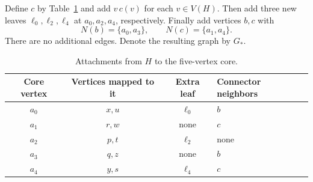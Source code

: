 \documentclass[11pt,a4paper]{article}
\theoremstyle{definition}
\theoremstyle{remark}
\newcommand{\Gstar}{G_{\ast}}
\begin{document}
Define $c$ by Table~\ref{tab:attachments} and add
$v\,c(v)$ for each $v\in V(H)$.
Then add three new leaves $\ell_0,\ell_2,\ell_4$ at
$a_0,a_2,a_4$, respectively. Finally add vertices $b,c$ with
\begin{equation}\label{eq:connectors}
              N(b)=\{a_0,a_3\},\qquad
              N(c)=\{a_1,a_4\}.
\end{equation}
There are no additional edges. Denote the resulting graph by
$\Gstar$.

\begin{table}[htbp]
\centering
\caption{Attachments from $H$ to the five-vertex core.}
\label{tab:attachments}
\begin{tabular}{@{}cccl@{}}
\toprule
Core vertex & Vertices mapped to it & Extra leaf & Connector neighbors\\
\midrule
$a_0$ & $x,u$ & $\ell_0$ & $b$\\
$a_1$ & $r,w$ & none & $c$\\
$a_2$ & $p,t$ & $\ell_2$ & none\\
$a_3$ & $q,z$ & none & $b$\\
$a_4$ & $y,s$ & $\ell_4$ & $c$\\
\bottomrule
\end{tabular}
\end{table}
\end{document}
